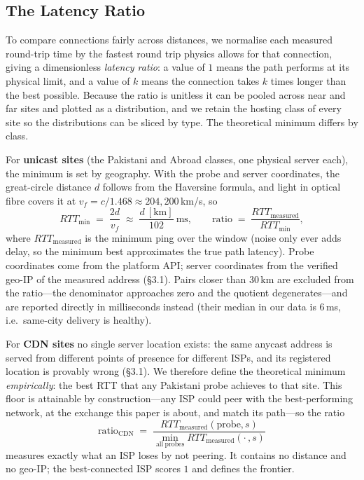 \subsection{The Latency Ratio}
\label{sec:ratio}
To compare connections fairly across distances, we normalise each measured round-trip time by the
fastest round trip physics allows for that connection, giving a dimensionless \emph{latency
ratio}: a value of $1$ means the path performs at its physical limit, and a value of $k$ means the
connection takes $k$ times longer than the best possible. Because the ratio is unitless it can be
pooled across near and far sites and plotted as a distribution, and we retain the hosting class of
every site so the distributions can be sliced by type. The theoretical minimum differs by class.

For \textbf{unicast sites} (the Pakistani and Abroad classes, one physical server each), the
minimum is set by geography. With the probe and server coordinates, the great-circle distance $d$
follows from the Haversine formula, and light in optical fibre covers it at
$v_f = c/1.468 \approx 204{,}200$\,km/s, so
\begin{equation}
  \mathit{RTT}_{\min} \;=\; \frac{2d}{v_f} \;\approx\; \frac{d~[\mathrm{km}]}{102}~\mathrm{ms},
  \qquad
  \text{ratio} \;=\; \frac{\mathit{RTT}_{\mathrm{measured}}}{\mathit{RTT}_{\min}},
\end{equation}
where $\mathit{RTT}_{\mathrm{measured}}$ is the minimum ping over the window (noise only ever adds
delay, so the minimum best approximates the true path latency). Probe coordinates come from the
platform API; server coordinates from the verified geo-IP of the measured address
(\S3.1). Pairs closer than 30\,km are excluded from the ratio---the denominator approaches zero
and the quotient degenerates---and are reported directly in milliseconds instead (their median in
our data is 6\,ms, i.e.\ same-city delivery is healthy).

For \textbf{CDN sites} no single server location exists: the same anycast address is served from
different points of presence for different ISPs, and its registered location is provably wrong
(\S3.1). We therefore define the theoretical minimum \emph{empirically}: the best RTT that any
Pakistani probe achieves to that site. This floor is attainable by construction---any ISP could
peer with the best-performing network, at the exchange this paper is about, and match its
path---so the ratio
\begin{equation}
  \text{ratio}_{\mathrm{CDN}} \;=\;
  \frac{\mathit{RTT}_{\mathrm{measured}}(\mathrm{probe}, s)}
       {\min_{\mathrm{all\ probes}} \mathit{RTT}_{\mathrm{measured}}(\cdot\,, s)}
\end{equation}
measures exactly what an ISP loses by not peering. It contains no distance and no geo-IP; the
best-connected ISP scores $1$ and defines the frontier.


